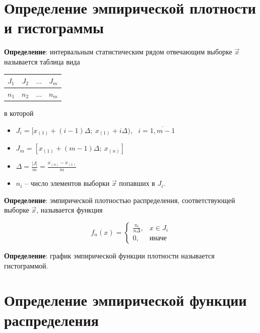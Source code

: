 \clearpage

\section{Определение эмпирической плотности и гистограммы}

\textbf{Определение}: интервальным статистическим рядом отвечающим выборке $\overrightarrow{x}$ называется таблица вида

\begin{table}
	\centering
	\begin{tabular}{|c|c|c|c|}
		\hline
		$J_1$ & $J_2$ & $\dots$ & $J_m$ \\
		\hline
		$n_1$ & $n_2$ & $\dots$ & $n_m$ \\
		\hline
	\end{tabular}
\end{table}

в которой

\begin{itemize}[]
	\item $J_i = [x_{(1)} + (i - 1) \Delta;~x_{(1)} + i \Delta),~~~i = \overline{1,m-1}$
	
	\item $J_m = [x_{(1)} + (m - 1) \Delta;~x_{(n)}]$
	
	\item $\displaystyle \Delta = \frac{|J|}{m} = \frac{x_{(n)} - x_{(1)}}{m}$
	
	\item $n_i$ -- число элементов выборки $\overrightarrow{x}$ попавших в $J_i$.
	
\end{itemize}

\textbf{Определение}: эмпирической плотностью распределения, соответствующей выборке $\overrightarrow{x}$, называется функция

\begin{equation}
	f_n(x) = \left\{\begin{array}{ll}
		{\displaystyle \frac{n_i}{n \Delta},} & x \in J_i \\
		0, & \textit{иначе}
	\end{array}\right.
\end{equation}

\textbf{Определение}: график эмпирической функции плотности называется гистограммой.

\section{Определение эмпирической функции распределения}

